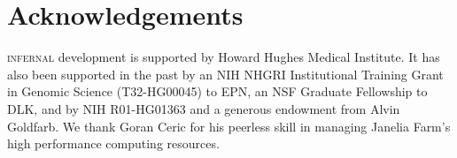 \section{Acknowledgements}

\textsc{infernal} development is supported by Howard Hughes Medical
Institute. It has also been supported in the past by an NIH NHGRI
Institutional Training Grant in Genomic Science (T32-HG00045) to EPN,
an NSF Graduate Fellowship to DLK, and by NIH R01-HG01363 and a
generous endowment from Alvin Goldfarb. We thank Goran Ceric for his
peerless skill in managing Janelia Farm's high performance computing
resources.

